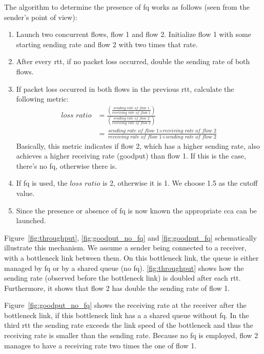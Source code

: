 \documentclass[runningheads]{llncs}
\newcommand{\mynote}[3]{
    \fbox{\bfseries\sffamily\scriptsize#1}
    {\small$\blacktriangleright$\textsf{\emph{\color{#3}{#2}}}$\blacktriangleleft$}}
\newcommand{\noteMax}[1]{\mynote{Max}{#1}{green}}
\begin{document}
The algorithm to determine the presence of \gls{fq} works as follows (seen from the sender's point of view):
\begin{enumerate}
\item Launch two concurrent flows, flow 1 and flow 2. Initialize flow 1 with some starting sending rate and flow 2 with two times that rate. 
\item After every \gls{rtt}, if no packet loss occurred, double the sending rate of both flows. 
\item If packet loss occurred in both flows in the previous \gls{rtt}, calculate the following metric: 
\begin{align}
\textit{loss ratio} &= \frac{\left(\frac{\textit{sending rate of flow 1}}{\textit{receiving rate of flow 1}}\right)}{\left(\frac{\textit{sending rate of flow 2}}{\textit{receiving rate of flow 2}}\right)} \\
&= \frac{\textit{sending rate of flow 1}\times \textit{receiving rate of flow 2}}{\textit{receiving rate of flow 1} \times \textit{sending rate of flow 2}}
\end{align}
Basically, this metric indicates if flow 2, which has a higher sending rate, also achieves a higher receiving rate (goodput) than flow 1. If this is the case, there's no \gls{fq}, otherwise there is. 
\item If \gls{fq} is used, the $\textit{loss ratio}$ is 2, otherwise it is 1. We choose 1.5 as the cutoff value. 
\item Since the presence or absence of \gls{fq} is now known the appropriate \gls{cca} can be launched. 
\end{enumerate}

Figure~\ref{fig:throughput}, \ref{fig:goodput_no_fq} and \ref{fig:goodput_fq} schematically illustrate this mechanism. We assume a sender being connected to a receiver, with a bottleneck link between them. On this bottleneck link, the queue is either managed by \gls{fq} or by a shared queue (no \gls{fq}). \autoref{fig:throughput} shows how the sending rate (observed before the bottleneck link) is doubled after each \gls{rtt}. Furthermore, it shows that flow 2 has double the sending rate of flow 1. %

Figure~\ref{fig:goodput_no_fq} shows the receiving rate at the receiver after the bottleneck link, if this bottleneck link has a a shared queue without \gls{fq}. In the third \gls{rtt} the sending rate exceeds the link speed of the bottleneck and thus the receiving rate is smaller than the sending rate. Because no \gls{fq} is employed, flow 2 manages to have a receiving rate two times the one of flow 1. 
\end{document}
